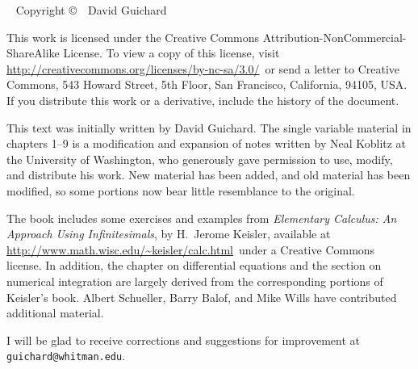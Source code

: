 \documentclass[justified,marginals=raggedouter]{tufte-book}
\newcounter{exercise}
\begin{document}
\begin{fullwidth}
~\vfill
\thispagestyle{empty}
\setlength{\parindent}{0pt}
\setlength{\parskip}{\baselineskip}
Copyright \copyright\ \the\year\ David Guichard

This work is licensed under the Creative Commons
Attribution-NonCommercial-ShareAlike License. To view a copy of this
license, visit 
\url{http://creativecommons.org/licenses/by-nc-sa/3.0/}~or
send a letter to Creative Commons, 543 Howard Street, 5th Floor, San
Francisco, California, 94105, USA. If you distribute this work or a
derivative, include the history of the document. 

\msk\noindent
This text was initially written by David Guichard. The single variable
material in chapters 1--9 is a modification and expansion of notes
written by Neal Koblitz at the University of Washington, who
generously gave permission to use, modify, and distribute his
work. New material has been added, and old material has been modified,
so some portions now bear little resemblance to the original.

\msk\noindent The book includes some exercises and examples from {\it
  Elementary Calculus: An Approach Using Infinitesimals}, by H.~Jerome
Keisler, available at
\url{http://www.math.wisc.edu/~keisler/calc.html}~under a Creative
Commons license. In addition, the chapter on differential equations
and the section on numerical integration are largely derived from the
corresponding portions of Keisler's book.  Albert Schueller, Barry
Balof, and Mike Wills have contributed additional material.


\msk\noindent
I will be glad to receive corrections and
suggestions for improvement at {\tt guichard@whitman.edu}. 

\end{fullwidth}

\tableofcontents

\listoffigures

\listoftables

\end{document}
